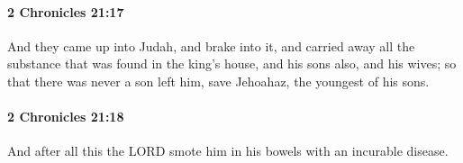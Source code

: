 		\paragraph{2 Chronicles 21:17} %
			\label{2CHRONICLES-21-17}

			And they came up into Judah, and brake into it, and carried away all the substance that was found in the king's house, and his sons also, and his wives; so that there was never a son left him, save Jehoahaz, the youngest of his sons.


		\paragraph{2 Chronicles 21:18} %
			\label{2CHRONICLES-21-18}

			And after all this the LORD smote him in his bowels with an incurable disease.


